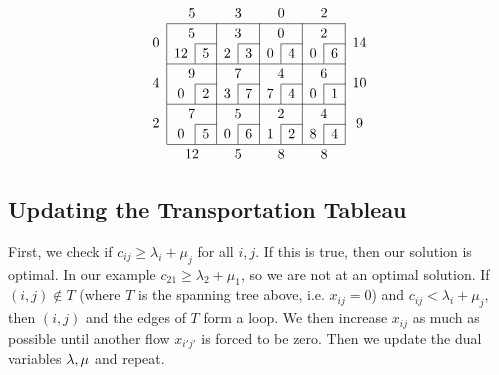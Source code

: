 \[
	\arraycolsep=5pt\def\arraystretch{1.2}
	\begin{array}{c|c|c|c|c|c|c|c|c|c}
		\multicolumn{1}{c}{}           & \multicolumn{2}{c}{5}              & \multicolumn{2}{c}{3}              & \multicolumn{2}{c}{0}              & \multicolumn{2}{c}{2}              & \multicolumn{1}{c}{}                                                          \\\cline{2-9}
		\multirow{2}{*}{\(0\)} & \multicolumn{2}{c|}{5} & \multicolumn{2}{c|}{3} & \multicolumn{2}{c|}{0} & \multicolumn{2}{c|}{2} & \multirow{2}{*}{\(14\)}                                                      \\\cline{3-3}\cline{5-5}\cline{7-7}\cline{9-9}
		                               & \multicolumn{1}{c|}{12}            & 5                                 & \multicolumn{1}{c|}{2}            & 3                                 & \multicolumn{1}{c|}{0} & 4 & \multicolumn{1}{c|}{0} & 6 & \\\cline{2-9}
		\multirow{2}{*}{\(4\)} & \multicolumn{2}{c|}{9} & \multicolumn{2}{c|}{7} & \multicolumn{2}{c|}{4} & \multicolumn{2}{c|}{6} & \multirow{2}{*}{\(10\)}                                                      \\\cline{3-3}\cline{5-5}\cline{7-7}\cline{9-9}
		                               & \multicolumn{1}{c|}{0}            & 2                                 & \multicolumn{1}{c|}{3}            & 7                                 & \multicolumn{1}{c|}{7} & 4 & \multicolumn{1}{c|}{0} & 1 & \\\cline{2-9}
		\multirow{2}{*}{\(2\)} & \multicolumn{2}{c|}{7} & \multicolumn{2}{c|}{5} & \multicolumn{2}{c|}{2} & \multicolumn{2}{c|}{4} & \multirow{2}{*}{\(9\)}                                                      \\\cline{3-3}\cline{5-5}\cline{7-7}\cline{9-9}
		                               & \multicolumn{1}{c|}{0}            & 5                                 & \multicolumn{1}{c|}{0}            & 6                                 & \multicolumn{1}{c|}{1} & 2 & \multicolumn{1}{c|}{8} & 4 & \\\cline{2-9}
		\multicolumn{1}{c}{}           & \multicolumn{2}{c}{12}                & \multicolumn{2}{c}{5}                & \multicolumn{2}{c}{8}                & \multicolumn{2}{c}{8}                & \multicolumn{1}{c}{}
	\end{array}
\]

\subsection{Updating the Transportation Tableau}
First, we check if \( c_{ij} \geq \lambda_i + \mu_j \) for all \( i, j \).
If this is true, then our solution is optimal.
In our example \( c_{21} \geq \lambda_2 + \mu_1 \), so we are not at an optimal solution.
If \( (i,j) \notin T \) (where \( T \) is the spanning tree above, i.e. \( x_{ij} = 0 \)) and \( c_{ij} < \lambda_i + \mu_j \), then \((i,j)\) and the edges of \( T \) form a loop.
We then increase \( x_{ij} \) as much as possible until another flow \(x_{i'j'}\) is forced to be zero.
Then we update the dual variables \( \vb \lambda, \vb \mu \) and repeat.

